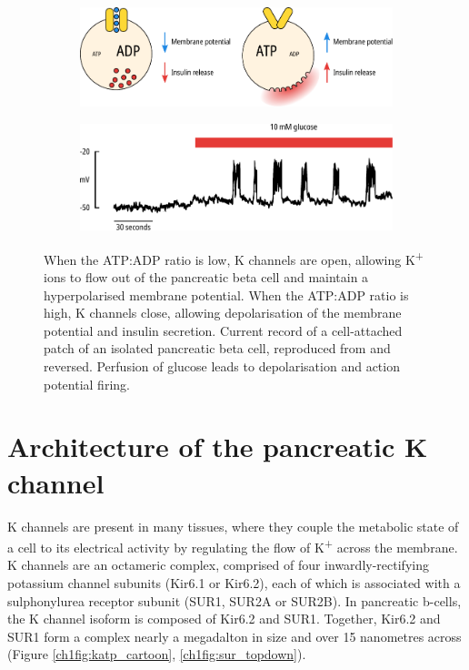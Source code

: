 \begin{figure}[h]
	\centering
	\begin{subfigure}[t]{0.9\textwidth}
		\caption{}\label{ch1fig:beta_cells}
		\centering
		\includegraphics[width=\textwidth]{beta_cells.pdf}
	\end{subfigure}
	\vfill
	\begin{subfigure}[t]{0.9\textwidth}
		\caption{}\label{ch1fig:beta_cells_firing}
		\centering
		\includegraphics[width=\textwidth]{beta_cells_firing.pdf}
	\end{subfigure}
	\caption[Electrical excitability of pancreatic beta cells]{
		 When the ATP:ADP ratio is low, K\ATP{} channels are open, allowing K\textsuperscript{+} ions to flow out of the pancreatic beta cell and maintain a hyperpolarised membrane potential.
		When the ATP:ADP ratio is high, K\ATP{} channels close, allowing depolarisation of the membrane potential and insulin secretion.
		 Current record of a cell-attached patch of an isolated pancreatic beta cell, reproduced from \cite{rorsman_glucose_1985-1} and reversed. 
		Perfusion of glucose leads to depolarisation and action potential firing.
	}
	\label{ch1fig:beta_cells_overview}
\end{figure}

\section{Architecture of the pancreatic K\ATP{} channel}

K\ATP{} channels are present in many tissues, where they couple the metabolic state of a cell to its electrical activity by regulating the flow of K\textsuperscript{+} across the membrane.
K\ATP{} channels are an octameric complex, comprised of four inwardly-rectifying potassium channel subunits (Kir6.1 or Kir6.2), each of which is associated with a sulphonylurea receptor subunit (SUR1, SUR2A or SUR2B).
In pancreatic \textgreek{b}-cells, the K\ATP{} channel isoform is composed of Kir6.2 and SUR1.
Together, Kir6.2 and SUR1 form a complex nearly a megadalton in size and over 15 nanometres across (Figure \ref{ch1fig:katp_cartoon}, \ref{ch1fig:sur_topdown}).

